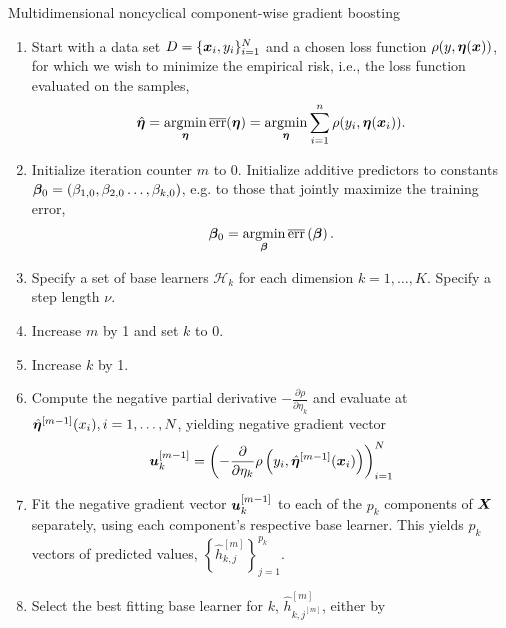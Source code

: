 \begin{algorithm}
\caption{Multidimensional noncyclical component-wise gradient boosting}
\label{algo:multi-noncyclical}
\begin{enumerate}
    \item
        Start with a data set $D=\{\bm{x}_i, y_i\}_{i=1}^N$ and a chosen loss function $\rho(y,\boldsymbol{\eta}(\bm{x}))$, for which we wish to
        minimize the empirical risk, i.e., the loss function evaluated on the samples,
        \begin{equation*}
            \hat{\boldsymbol{\eta}}=\operatorname*{argmin}_{\boldsymbol{\eta}}\overline{\text{err}}(\boldsymbol{\eta})=\operatorname*{argmin}_{\boldsymbol{\eta}}\sum_{i=1}^n \rho(y_i,\boldsymbol{\eta}(\bm{x}_i)).
        \end{equation*}
    \item
        Initialize iteration counter $m$ to 0.
        Initialize additive predictors to constants $\boldsymbol{\beta}_0=\left(\beta_{1,0},\beta_{2,0}\ldots,\beta_{k,0}\right)$, e.g. to those that jointly maximize the training error,
        \begin{equation*}
            \boldsymbol{\beta}_0=\operatorname*{argmin}_{\boldsymbol{\beta}}\overline{\text{err}}\left(\boldsymbol{\beta}\right).
        \end{equation*}
    \item
        Specify a set of base learners $\mathcal{H}_k$ for each dimension $k=1,\ldots,K$.
        Specify a step length $\nu$.
    \item
        \label{noncyclic-step-first-loop}
        Increase $m$ by 1 and set $k$ to 0.
    \item
        Increase $k$ by 1.
    \item
        Compute the negative partial derivative $-\frac{\partial\rho}{\partial \eta_k}$
        and evaluate at $\hat{\boldsymbol{\eta}}^{[m-1]}(x_i),i=1,\ldots,N$, yielding negative gradient vector
        \begin{equation*}
            \bm{u}^{[m-1]}_k=\left(-\frac{\partial}{\partial \eta_k}\rho\left(y_i, \hat{\boldsymbol{\eta}}^{[m-1]}(\bm{x}_i)\right)\right)_{i=1}^N
        \end{equation*}
    \item
        Fit the negative gradient vector $\bm{u}_k^{[m-1]}$ to each of the $p_k$ components of $\bm{X}$ separately, using each component's respective base learner.
        This yields $p_k$ vectors of predicted values, $\left\{\hat{h}_{k,j}^{[m]}\right\}_{j=1}^{p_k}$.
    \item
        Select the best fitting base learner for $k$, $\hat{h}_{k,j^{[m]}}^{[m]}$, either by
        \begin{itemize}

\end{itemize}
\end{enumerate}
\end{algorithm}

